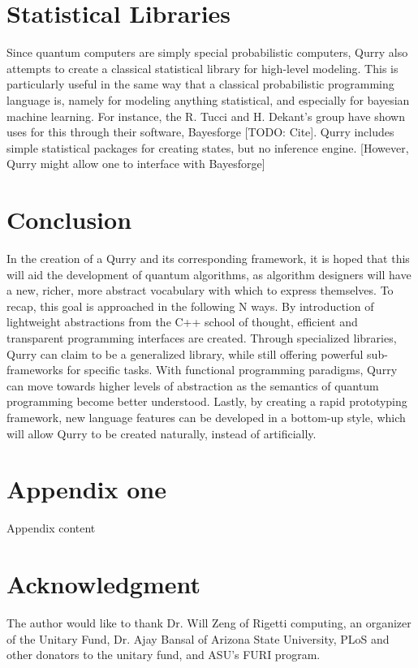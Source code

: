 \documentclass[journal]{article}
\begin{document}
\section{Statistical Libraries}

Since quantum computers are simply special probabilistic computers, Qurry also attempts to create a classical statistical library for high-level modeling. 
This is particularly useful in the same way that a classical probabilistic programming language is, namely for modeling anything statistical, and especially for bayesian machine learning.
For instance, the R. Tucci and H. Dekant's group have shown uses for this through their software, Bayesforge [TODO: Cite].
Qurry includes simple statistical packages for creating states, but no inference engine.
[However, Qurry might allow one to interface with Bayesforge]

\section{Conclusion}

In the creation of a Qurry and its corresponding framework, it is hoped that this will aid the development of quantum algorithms, as algorithm designers will have a new, richer, more abstract vocabulary with which to express themselves.
To recap, this goal is approached in the following N ways.
By introduction of lightweight abstractions from the C++ school of thought, efficient and transparent programming interfaces are created.
Through specialized libraries, Qurry can claim to be a generalized library, while still offering powerful sub-frameworks for specific tasks.
With functional programming paradigms, Qurry can move towards higher levels of abstraction as the semantics of quantum programming become better understood.
Lastly, by creating a rapid prototyping framework, new language features can be developed in a bottom-up style, which will allow Qurry to be created naturally, instead of artificially.

 \section{Appendix one}
Appendix content

\section*{Acknowledgment}

The author would like to thank Dr. Will Zeng of Rigetti computing, an organizer of the Unitary Fund, Dr. Ajay Bansal of Arizona State University, PLoS and other donators to the unitary fund, and ASU's FURI program.

\newpage



\end{document}
